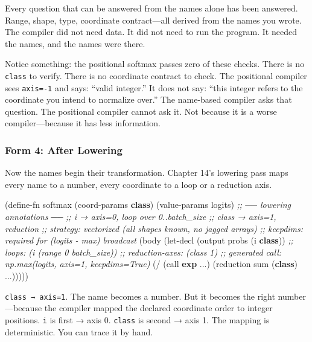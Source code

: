 \documentclass[11pt,titlepage]{article}
\newenvironment{Shaded}{}{}
\newcommand{\CommentTok}[1]{\textcolor[rgb]{0.38,0.63,0.69}{\textit{#1}}}
\newcommand{\KeywordTok}[1]{\textcolor[rgb]{0.00,0.44,0.13}{\textbf{#1}}}
\newcommand{\NormalTok}[1]{#1}
\newcommand{\OperatorTok}[1]{\textcolor[rgb]{0.40,0.40,0.40}{#1}}
\begin{document}
Every question that can be answered from the names alone has been
answered. Range, shape, type, coordinate contract---all derived from the
names you wrote. The compiler did not need data. It did not need to run
the program. It needed the names, and the names were there.

Notice something: the positional softmax passes zero of these checks.
There is no \texttt{class} to verify. There is no coordinate contract to
check. The positional compiler sees \texttt{axis=-1} and says: ``valid
integer.'' It does not say: ``this integer refers to the coordinate you
intend to normalize over.'' The name-based compiler asks that question.
The positional compiler cannot ask it. Not because it is a worse
compiler---because it has less information.

\vspace{2em}

\hypertarget{form-4-after-lowering}{%
\subsubsection{Form 4: After Lowering}\label{form-4-after-lowering}}

Now the names begin their transformation. Chapter 14's lowering pass
maps every name to a number, every coordinate to a loop or a reduction
axis.

\begin{Shaded}
\begin{Highlighting}[]
\NormalTok{(define-fn softmax (coord-params }\KeywordTok{class}\NormalTok{) (value-params logits)}
  \CommentTok{;; ── lowering annotations ──}
  \CommentTok{;; i     → axis=0, loop over 0..batch_size}
  \CommentTok{;; class → axis=1, reduction}
  \CommentTok{;; strategy: vectorized (all shapes known, no jagged arrays)}
  \CommentTok{;; keepdims: required for (logits - max) broadcast}
\NormalTok{  (body}
\NormalTok{    (let-decl (output probs (i }\KeywordTok{class}\NormalTok{))}
      \CommentTok{;; loops: (i (range 0 batch_size))}
      \CommentTok{;; reduction-axes: (class 1)}
      \CommentTok{;; generated call: np.max(logits, axis=1, keepdims=True)}
\NormalTok{      (}\OperatorTok{/}\NormalTok{ (call }\KeywordTok{exp}\NormalTok{ ...) (reduction sum (}\KeywordTok{class}\NormalTok{) ...)))))}
\end{Highlighting}
\end{Shaded}

\texttt{class\ →\ axis=1}. The name becomes a number. But it becomes the
right number---because the compiler mapped the declared coordinate order
to integer positions. \texttt{i} is first → axis 0. \texttt{class} is
second → axis 1. The mapping is deterministic. You can trace it by hand.
\end{document}
